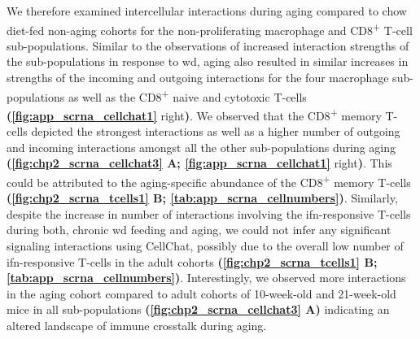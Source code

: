 \par  We therefore examined intercellular interactions during aging compared to chow diet-fed non-aging cohorts for the non-proliferating macrophage and CD8\textsuperscript{+} T-cell sub-populations. Similar to the observations of increased interaction strengths of the sub-populations in response to \gls{wd}, aging also resulted in similar increases in strengths of the incoming and outgoing interactions for the four macrophage sub-populations as well as the CD8\textsuperscript{+} naive and cytotoxic T-cells \textbf{(\autoref{fig:app_scrna_cellchat1}} right\textbf{)}. We observed that the CD8\textsuperscript{+} memory T-cells depicted the strongest interactions as well as a higher number of outgoing and incoming interactions amongst all the other sub-populations during aging \textbf{(\autoref{fig:chp2_scrna_cellchat3} A; \autoref{fig:app_scrna_cellchat1}} right\textbf{)}. This could be attributed to the aging-specific abundance of the CD8\textsuperscript{+} memory T-cells \textbf{(\autoref{fig:chp2_scrna_tcells1} B; \autoref{tab:app_scrna_cellnumbers})}. Similarly, despite the increase in number of interactions involving the \gls{ifn}-responsive T-cells during both, chronic \gls{wd} feeding and aging, we could not infer any significant signaling interactions using CellChat, possibly due to the overall low number of \gls{ifn}-responsive T-cells in the adult cohorts \textbf{(\autoref{fig:chp2_scrna_tcells1} B; \autoref{tab:app_scrna_cellnumbers})}. Interestingly, we observed more interactions in the aging cohort compared to adult cohorts of 10-week-old and 21-week-old mice in all sub-populations \textbf{(\autoref{fig:chp2_scrna_cellchat3} A)} indicating an altered landscape of immune crosstalk during aging.

